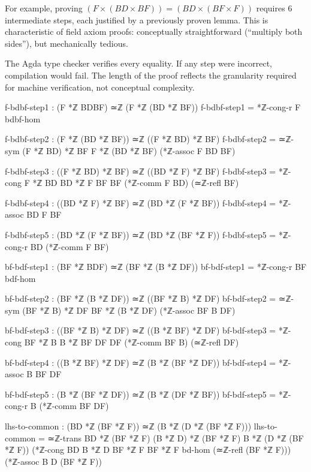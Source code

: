 \documentclass[11pt,a4paper]{book}
\begin{document}
For example, proving $(F \times (BD \times BF)) = (BD \times (BF \times F))$ requires 
6 intermediate steps, each justified by a previously proven lemma. This is characteristic 
of field axiom proofs: conceptually straightforward (``multiply both sides''), but 
mechanically tedious.

The Agda type checker verifies every equality. If any step were incorrect, compilation 
would fail. The length of the proof reflects the granularity required for machine verification, 
not conceptual complexity.

\begin{code}        
        f-bdbf-step1 : (F *ℤ BDBF) ≃ℤ (F *ℤ (BD *ℤ BF))
        f-bdbf-step1 = *ℤ-cong-r F bdbf-hom
        
        f-bdbf-step2 : (F *ℤ (BD *ℤ BF)) ≃ℤ ((F *ℤ BD) *ℤ BF)
        f-bdbf-step2 = ≃ℤ-sym {(F *ℤ BD) *ℤ BF} {F *ℤ (BD *ℤ BF)} (*ℤ-assoc F BD BF)
        
        f-bdbf-step3 : ((F *ℤ BD) *ℤ BF) ≃ℤ ((BD *ℤ F) *ℤ BF)
        f-bdbf-step3 = *ℤ-cong {F *ℤ BD} {BD *ℤ F} {BF} {BF} (*ℤ-comm F BD) (≃ℤ-refl BF)
        
        f-bdbf-step4 : ((BD *ℤ F) *ℤ BF) ≃ℤ (BD *ℤ (F *ℤ BF))
        f-bdbf-step4 = *ℤ-assoc BD F BF
        
        f-bdbf-step5 : (BD *ℤ (F *ℤ BF)) ≃ℤ (BD *ℤ (BF *ℤ F))
        f-bdbf-step5 = *ℤ-cong-r BD (*ℤ-comm F BF)
        
        bf-bdf-step1 : (BF *ℤ BDF) ≃ℤ (BF *ℤ (B *ℤ DF))
        bf-bdf-step1 = *ℤ-cong-r BF bdf-hom
        
        bf-bdf-step2 : (BF *ℤ (B *ℤ DF)) ≃ℤ ((BF *ℤ B) *ℤ DF)
        bf-bdf-step2 = ≃ℤ-sym {(BF *ℤ B) *ℤ DF} {BF *ℤ (B *ℤ DF)} (*ℤ-assoc BF B DF)
        
        bf-bdf-step3 : ((BF *ℤ B) *ℤ DF) ≃ℤ ((B *ℤ BF) *ℤ DF)
        bf-bdf-step3 = *ℤ-cong {BF *ℤ B} {B *ℤ BF} {DF} {DF} (*ℤ-comm BF B) (≃ℤ-refl DF)
        
        bf-bdf-step4 : ((B *ℤ BF) *ℤ DF) ≃ℤ (B *ℤ (BF *ℤ DF))
        bf-bdf-step4 = *ℤ-assoc B BF DF
        
        bf-bdf-step5 : (B *ℤ (BF *ℤ DF)) ≃ℤ (B *ℤ (DF *ℤ BF))
        bf-bdf-step5 = *ℤ-cong-r B (*ℤ-comm BF DF)
        
        lhs-to-common : (BD *ℤ (BF *ℤ F)) ≃ℤ (B *ℤ (D *ℤ (BF *ℤ F)))
        lhs-to-common = ≃ℤ-trans {BD *ℤ (BF *ℤ F)} {(B *ℤ D) *ℤ (BF *ℤ F)} {B *ℤ (D *ℤ (BF *ℤ F))}
                         (*ℤ-cong {BD} {B *ℤ D} {BF *ℤ F} {BF *ℤ F} bd-hom (≃ℤ-refl (BF *ℤ F)))
                         (*ℤ-assoc B D (BF *ℤ F))


\end{code}
\end{document}
